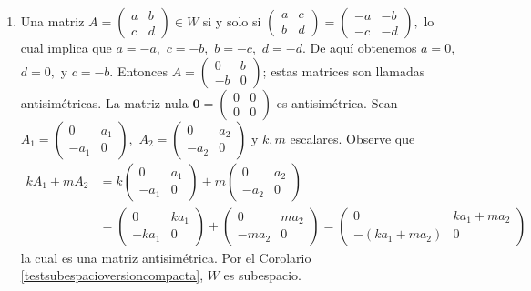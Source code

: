 \begin{example}
\begin{myproof}
\begin{enumerate}[$(a)$]
\item Una matriz $A=\begin{pmatrix}a&b\\c&d\end{pmatrix}\in W$ si y solo si $\begin{pmatrix}a&c\\b&d\end{pmatrix}=\begin{pmatrix}-a&-b\\-c&-d\end{pmatrix},$ lo cual implica que $a=-a,$ $c=-b,$ $b=-c,$ $d=-d.$ De aquí obtenemos $a=0,$ $d=0,$ y $c=-b.$ Entonces $A=\begin{pmatrix}0&b\\-b&0\end{pmatrix}$; estas matrices son llamadas antisimétricas. La matriz nula $\mathbf{0}=\begin{pmatrix} 0&0\\0&0\end{pmatrix}$ es antisimétrica. Sean $A_1=\begin{pmatrix}0&a_1\\-a_1&0\end{pmatrix},$ $A_2=\begin{pmatrix}0&a_2\\-a_2&0\end{pmatrix}$ y $k,m$ escalares. Observe que
\begin{align*}
kA_1+mA_2&=k\begin{pmatrix}0&a_1\\-a_1&0\end{pmatrix}+m\begin{pmatrix}0&a_2\\-a_2&0\end{pmatrix}\\&=\begin{pmatrix}0&ka_1\\-ka_1&0\end{pmatrix}+\begin{pmatrix}0&ma_2\\-ma_2&0\end{pmatrix}=\begin{pmatrix}0&ka_1+ma_2\\-(ka_1+ma_2)&0\end{pmatrix}
\end{align*}  la cual es una matriz antisimétrica. Por el Corolario \ref{testsubespacioversioncompacta}, $W$ es subespacio.
\end{enumerate}
\end{myproof}
\end{example}

